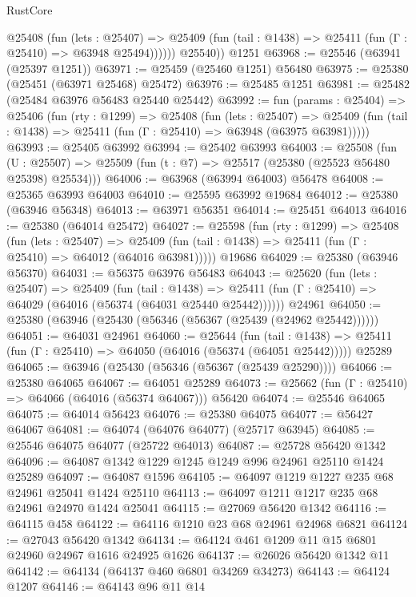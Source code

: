 \begin{lexlean}{RustCore}
\begin{coremodule}
            @25408
              (fun (lets : @25407) =>
              @25409 (fun (tail : @1438) => @25411 (fun (Γ : @25410) => @63948 @25494))))))
        @25540))
    @1251
@63968 := @25546 (@63941 (@25397 @1251))
@63971 := @25459 (@25460 @1251) @56480
@63975 := @25380 (@25451 (@63971 @25468) @25472)
@63976 := @25485 @1251
@63981 := @25482 (@25484 @63976 @56483 @25440 @25442)
@63992 := fun (params : @25404) =>
  @25406
    (fun (rty : @1299) =>
    @25408
      (fun (lets : @25407) =>
      @25409 (fun (tail : @1438) => @25411 (fun (Γ : @25410) => @63948 (@63975 @63981)))))
@63993 := @25405 @63992
@63994 := @25402 @63993
@64003 := @25508
    (fun (U : @25507) => @25509 (fun (t : @7) => @25517 (@25380 (@25523 @56480 @25398) @25534)))
@64006 := @63968 (@63994 @64003) @56478
@64008 := @25365 @63993 @64003
@64010 := @25595 @63992 @19684
@64012 := @25380 (@63946 @56348)
@64013 := @63971 @56351
@64014 := @25451 @64013
@64016 := @25380 (@64014 @25472)
@64027 := @25598
    (fun (rty : @1299) =>
    @25408
      (fun (lets : @25407) =>
      @25409 (fun (tail : @1438) => @25411 (fun (Γ : @25410) => @64012 (@64016 @63981)))))
    @19686
@64029 := @25380 (@63946 @56370)
@64031 := @56375 @63976 @56483
@64043 := @25620
    (fun (lets : @25407) =>
    @25409
      (fun (tail : @1438) =>
      @25411 (fun (Γ : @25410) => @64029 (@64016 (@56374 (@64031 @25440 @25442))))))
    @24961
@64050 := @25380 (@63946 (@25430 (@56346 (@56367 (@25439 (@24962 @25442))))))
@64051 := @64031 @24961
@64060 := @25644
    (fun (tail : @1438) => @25411 (fun (Γ : @25410) => @64050 (@64016 (@56374 (@64051 @25442)))))
    @25289
@64065 := @63946 (@25430 (@56346 (@56367 (@25439 @25290))))
@64066 := @25380 @64065
@64067 := @64051 @25289
@64073 := @25662 (fun (Γ : @25410) => @64066 (@64016 (@56374 @64067))) @56420
@64074 := @25546 @64065
@64075 := @64014 @56423
@64076 := @25380 @64075
@64077 := @56427 @64067
@64081 := @64074 (@64076 @64077) (@25717 @63945)
@64085 := @25546 @64075 @64077 (@25722 @64013)
@64087 := @25728 @56420 @1342
@64096 := @64087 @1342 @1229 @1245 @1249 @996 @24961 @25110 @1424 @25289
@64097 := @64087 @1596
@64105 := @64097 @1219 @1227 @235 @68 @24961 @25041 @1424 @25110
@64113 := @64097 @1211 @1217 @235 @68 @24961 @24970 @1424 @25041
@64115 := @27069 @56420 @1342
@64116 := @64115 @458
@64122 := @64116 @1210 @23 @68 @24961 @24968 @6821
@64124 := @27043 @56420 @1342
@64134 := @64124 @461 @1209 @11 @15 @6801 @24960 @24967 @1616 @24925 @1626
@64137 := @26026 @56420 @1342 @11
@64142 := @64134 (@64137 @460 @6801 @34269 @34273)
@64143 := @64124 @1207
@64146 := @64143 @96 @11 @14

\end{coremodule}
\end{lexlean}
